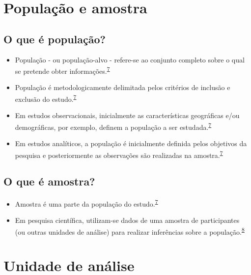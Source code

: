 \documentclass[
  a4paper,
]{book}
\begin{document}
\hypertarget{populacao-amostra}{%
\section{População e amostra}\label{populacao-amostra}}

\hypertarget{o-que-uxe9-populauxe7uxe3o}{%
\subsection{O que é população?}\label{o-que-uxe9-populauxe7uxe3o}}

\begin{itemize}
\item
  População - ou população-alvo - refere-se ao conjunto completo sobre o qual se pretende obter informações.\textsuperscript{\protect\hyperlink{ref-Banerjee2010}{7}}
\item
  População é metodologicamente delimitada pelos critérios de inclusão e exclusão do estudo.\textsuperscript{\protect\hyperlink{ref-Banerjee2010}{7}}
\item
  Em estudos observacionais, inicialmente as características geográficas e/ou demográficas, por exemplo, definem a população a ser estudada.\textsuperscript{\protect\hyperlink{ref-Banerjee2010}{7}}
\item
  Em estudos analíticos, a população é inicialmente definida pelos objetivos da pesquisa e posteriormente as observações são realizadas na amostra.\textsuperscript{\protect\hyperlink{ref-Banerjee2010}{7}}
\end{itemize}

\hypertarget{o-que-uxe9-amostra}{%
\subsection{O que é amostra?}\label{o-que-uxe9-amostra}}

\begin{itemize}
\item
  Amostra é uma parte da população do estudo.\textsuperscript{\protect\hyperlink{ref-Banerjee2010}{7}}
\item
  Em pesquisa científica, utilizam-se dados de uma amostra de participantes (ou outras unidades de análise) para realizar inferências sobre a população.\textsuperscript{\protect\hyperlink{ref-Bland2015}{8}}
\end{itemize}

\hypertarget{unidade-analise}{%
\section{Unidade de análise}\label{unidade-analise}}
\end{document}
